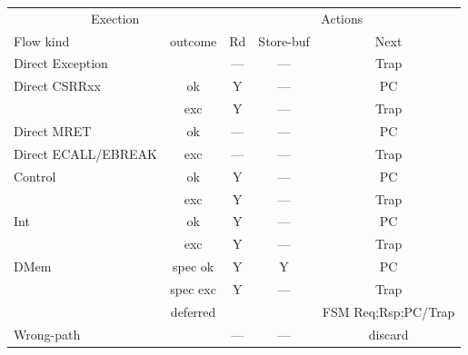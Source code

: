 \begin{center}
 \begin{tabular}{|l|c||c|c|c|}
  \hline
   \multicolumn{2}{|c|}{Exection} & \multicolumn{3}{|c|}{Actions} \\
   Flow kind           & outcome  & Rd   & Store-buf & Next  \\
  \hline
  \hline
   Direct Exception    &          & ---  &   ---     & Trap  \\
  \hline
   Direct CSRRxx       &   ok     &  Y   &   ---     &  PC   \\
                       &   exc    &  Y   &   ---     & Trap  \\
  \hline
   Direct MRET         &   ok     & ---  &   ---     &  PC   \\
  \hline
   Direct ECALL/EBREAK &   exc    & ---  &   ---     & Trap  \\
  \hline
   Control             &   ok     &  Y   &   ---     &  PC   \\
                       &   exc    &  Y   &   ---     & Trap  \\
  \hline
   Int                 &   ok     &  Y   &   ---     &  PC   \\
                       &   exc    &  Y   &   ---     & Trap  \\
  \hline
   DMem                & spec ok  &  Y   &   Y       &  PC   \\
                       & spec exc &  Y   &   ---     & Trap  \\
                       & deferred &      &           & FSM Req;Rsp;PC/Trap \\
  \hline
   Wrong-path          &          & ---  &   ---     & discard  \\
  \hline
 \end{tabular}
\end{center}

